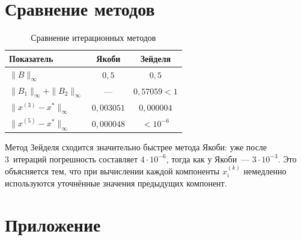 \documentclass[a4paper, final]{article}
\begin{document}
\section{Сравнение методов}

\begin{table}[h!]
\centering
\caption{Сравнение итерационных методов}
\label{tab:compare}
\renewcommand{\arraystretch}{1.4}
\begin{tabular}{|l|c|c|}
\hline
Показатель & Якоби & Зейделя \\
\hline
$\|B\|_\infty$ & $0{,}5$ & $0{,}5$ \\
\hline
$\|B_1\|_\infty + \|B_2\|_\infty$ & --- & $0{,}57059 < 1$ \\
\hline
$\|x^{(3)}-x^*\|_\infty$ & $0{,}003051$ & $0{,}000004$ \\
\hline
$\|x^{(5)}-x^*\|_\infty$ & $0{,}000048$ & $<10^{-6}$ \\
\hline
\end{tabular}
\end{table}

Метод Зейделя сходится значительно быстрее метода Якоби: уже после
3~итераций погрешность составляет $4\cdot10^{-6}$, тогда как у Якоби~---
$3\cdot10^{-3}$. Это объясняется тем, что при вычислении каждой компоненты
$x_i^{(k)}$ немедленно используются уточнённые значения предыдущих компонент.

\newpage

\section*{Приложение}
\end{document}

